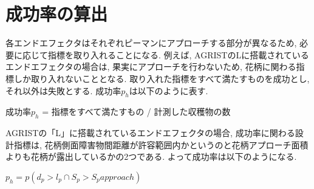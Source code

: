 \section{成功率の算出}
各エンドエフェクタはそれぞれピーマンにアプローチする部分が異なるため, 必要に応じて指標を取り入れることになる.
例えば, AGRISTのLに搭載されているエンドエフェクタの場合は, 果実にアプローチを行わないため, 花柄に関わる指標しか取り入れないこととなる.
取り入れた指標をすべて満たすものを成功とし, それ以外は失敗とする.
成功率$p_h$は以下のように表す.

\vspace{10mm}
成功率$p_h$ = 指標をすべて満たすもの / 計測した収穫物の数
\vspace{10mm}

AGRISTの「L」に搭載されているエンドエフェクタの場合, 成功率に関わる設計指標は, 花柄側面障害物間距離が許容範囲内かというのと花柄アプローチ面積よりも花柄が露出しているかの2つである.
よって成功率は以下のようになる.

\vspace{10mm}
$p_h = p(d_p > l_p \cap S_p > S_papproach)$
\vspace{10mm}
